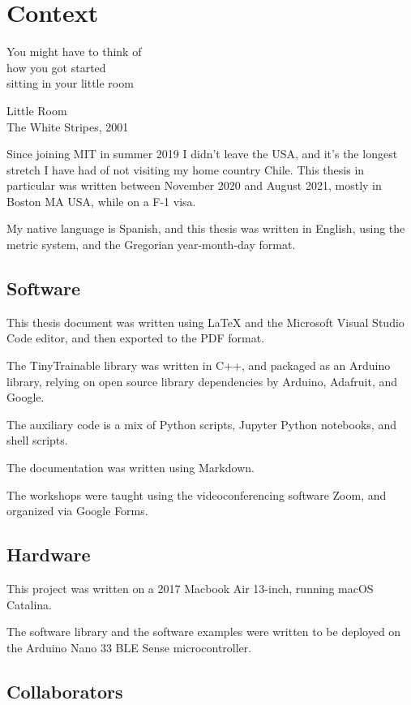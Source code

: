 \chapter{Context}

\epigraph{You might have to think  of \\ how you got started \\ sitting in your little room}{Little Room \\ The White Stripes, 2001}

Since joining MIT in summer 2019 I didn't leave the USA, and it's the longest stretch I have had of not visiting my home country Chile. This thesis in particular was written between November 2020 and August 2021, mostly in Boston MA USA, while on a F-1 visa.

My native language is Spanish, and this thesis was written in English, using the metric system, and the Gregorian year-month-day format.

\section{Software}

This thesis document was written using LaTeX and the Microsoft Visual Studio Code editor, and then exported to the PDF format.

The TinyTrainable library was written in C++, and packaged as an Arduino library, relying on open source library dependencies by Arduino, Adafruit, and Google.

The auxiliary code is a mix of Python scripts, Jupyter Python notebooks, and shell scripts.

The documentation was written using Markdown.

The workshops were taught using the videoconferencing software Zoom, and organized via Google Forms.

\section{Hardware}

This project was written on a 2017 Macbook Air 13-inch, running macOS Catalina.

The software library and the software examples were written to be deployed on the Arduino Nano 33 BLE Sense microcontroller.

\section{Collaborators}


